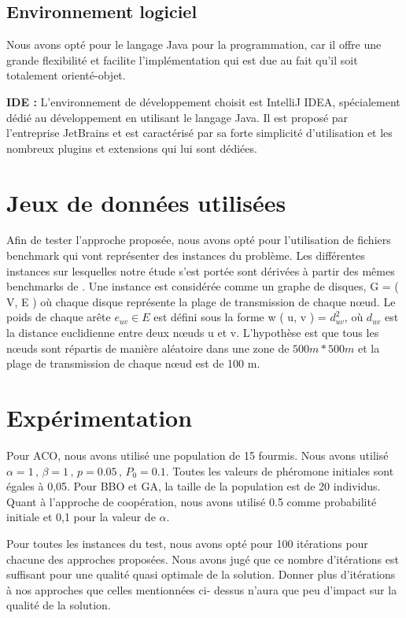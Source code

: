\subsection{Environnement logiciel}
Nous avons opté pour le langage Java pour la programmation, car il offre une grande flexibilité et facilite l’implémentation qui est due au fait qu’il soit totalement orienté-objet.

\textbf{IDE :}
L’environnement de développement choisit est IntelliJ IDEA, spécialement dédié au développement en utilisant le langage Java. Il est proposé par l’entreprise JetBrains et est caractérisé par sa forte simplicité d’utilisation et les nombreux plugins et extensions qui lui sont dédiées.

\section{Jeux de données utilisées}
Afin de tester l'approche proposée, nous avons opté pour l'utilisation de fichiers benchmark qui vont représenter des instances du problème. Les différentes instances sur lesquelles notre étude s'est portée sont dérivées à partir des mêmes benchmarks de \cite{sundar2013new}. Une instance est considérée comme un graphe de disques, G = ( V, E ) où chaque disque représente la plage de transmission de chaque nœud. Le poids de chaque arête $e_{uv} \in E $ est défini sous la forme w ( u, v ) = $d_{uv}^2$, où $d_{uv}$  est la distance euclidienne entre deux nœuds u et v. L'hypothèse est que tous les nœuds sont répartis de manière aléatoire dans une zone de $500m * 500m $  et la plage de transmission de chaque nœud est de 100 m.


\section{Expérimentation}

Pour ACO, nous avons utilisé une population de 15 fourmis. Nous avons utilisé $\alpha = 1 \, , \, \beta = 1 \, , \, p = 0.05 \, , \, P_0 = 0.1 $. Toutes les valeurs de phéromone initiales sont égales à 0,05. Pour BBO et GA, la taille de la population est de 20 individus. Quant à l’approche de coopération,  nous avons utilisé 0.5 comme probabilité initiale et 0,1 pour la valeur de  \( \alpha \).

Pour toutes les instances du test, nous avons opté pour 100 itérations pour chacune des approches proposées. Nous avons jugé que ce nombre d'itérations est suffisant pour une qualité quasi optimale de la solution. Donner plus d'itérations à nos approches que celles mentionnées ci- dessus n'aura que peu d'impact sur la qualité de la solution. 

